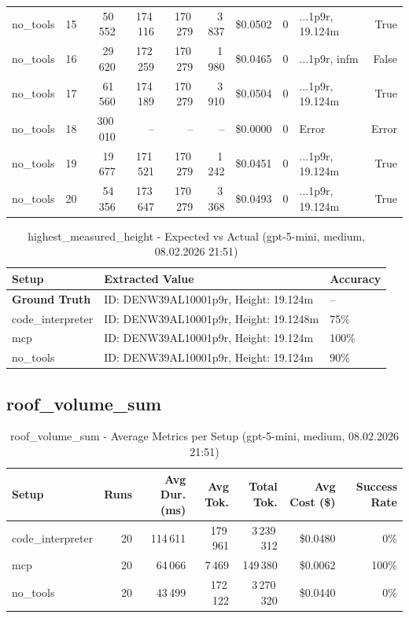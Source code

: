 \documentclass[a4paper,11pt]{article}
\begin{document}
\begin{table}[H]
{\begin{tabular}{l r r r r r r r l r}
no\_tools & 15 & 50\,552 & 174\,116 & 170\,279 & 3\,837 & \$0.0502 & 0 & ...1p9r, 19.124m & True \\
no\_tools & 16 & 29\,620 & 172\,259 & 170\,279 & 1\,980 & \$0.0465 & 0 & ...1p9r, infm & False \\
no\_tools & 17 & 61\,560 & 174\,189 & 170\,279 & 3\,910 & \$0.0504 & 0 & ...1p9r, 19.124m & True \\
no\_tools & 18 & 300\,010 & -- & -- & -- & \$0.0000 & 0 & Error & Error \\
no\_tools & 19 & 19\,677 & 171\,521 & 170\,279 & 1\,242 & \$0.0451 & 0 & ...1p9r, 19.124m & True \\
no\_tools & 20 & 54\,356 & 173\,647 & 170\,279 & 3\,368 & \$0.0493 & 0 & ...1p9r, 19.124m & True \\
\bottomrule
\end{tabular}}
\end{table}

\begin{table}[H]
\centering
\scriptsize
\caption{highest\_measured\_height - Expected vs Actual (gpt-5-mini, medium, 08.02.2026 21:51)}
\begin{tabular}{l l l}
\toprule
Setup & Extracted Value & Accuracy \\
\midrule
\textbf{Ground Truth} & ID: DENW39AL10001p9r, Height: 19.124m & -- \\
\midrule
code\_interpreter & ID: DENW39AL10001p9r, Height: 19.1248m & 75\% \\
mcp & ID: DENW39AL10001p9r, Height: 19.124m & 100\% \\
no\_tools & ID: DENW39AL10001p9r, Height: 19.124m & 90\% \\
\bottomrule
\end{tabular}
\end{table}

\clearpage

\subsection{roof\_volume\_sum}

\begin{table}[H]
\centering
\scriptsize
\caption{roof\_volume\_sum - Average Metrics per Setup (gpt-5-mini, medium, 08.02.2026 21:51)}
\label{tab:combined\_roof\_volume\_sum\_metrics\_20260208}
\begin{tabular}{l r r r r r r}
\toprule
Setup & Runs & Avg Dur. (ms) & Avg Tok. & Total Tok. & Avg Cost (\$) & Success Rate \\
\midrule
code\_interpreter & 20 & 114\,611 & 179\,961 & 3\,239\,312 & \$0.0480 & 0\% \\
mcp & 20 & 64\,066 & 7\,469 & 149\,380 & \$0.0062 & 100\% \\
no\_tools & 20 & 43\,499 & 172\,122 & 3\,270\,320 & \$0.0440 & 0\% \\
\bottomrule
\end{tabular}
\end{table}
\end{document}

